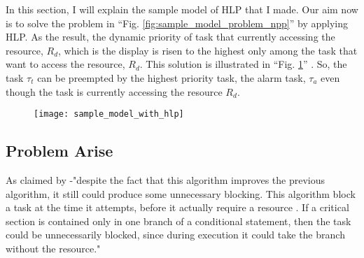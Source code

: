 In this section, I will explain the sample model of HLP that I made. Our aim now is to solve the problem in ``Fig. \ref{fig:sample_model_problem_npp}'' by applying HLP. As the result, the dynamic priority of task that currently accessing the resource, $ R_{d}$, which is the display is risen to the highest only among the task that want to access the resource, $ R_{d}$. This solution is illustrated in ``Fig. \ref{fig:sample_model_with_hlp}'' . So, the task $ \tau_{t}$ can be preempted by the highest priority task, the alarm task, $\tau_{a}$ even though the task is currently accessing the resource $ R_{d}$.


\begin{figure}[ht]
    \centering
    \texttt{[image: sample\_model\_with\_hlp]}
    \caption{}
    \label{fig:sample_model_with_hlp}
\end{figure}


\subsection{Problem Arise}

As claimed by \cite{b5} -"despite the fact that this algorithm improves the previous algorithm, it still could produce some unnecessary blocking. This algorithm block a task at the time it attempts, before it actually require a resource \cite{b5}. If a critical section is contained only in one branch of a conditional statement, then the task could be unnecessarily blocked, since during execution it could take the branch without the resource."
 










